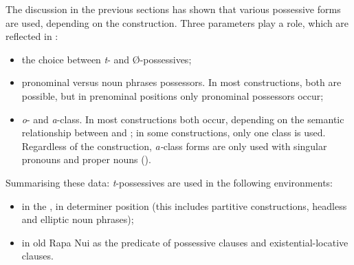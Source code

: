 
The discussion in the previous sections has shown that various possessive forms are used, depending on the construction. Three parameters play a role, which are reflected in :

\begin{itemize}
\item 
the choice between \textit{t}{}- and Ø-possessives;

\item 
pronominal versus noun phrases possessors. In most constructions, both are possible, but in prenominal positions only pronominal possessors occur; 

\item 
\textit{o}{}- and \textit{a}{}-class. In most constructions both occur, depending on the semantic relationship between  and ; in some constructions, only one class is used. Regardless of the construction, \textit{a-}class forms are only used with singular pronouns and proper nouns ().

\end{itemize}

Summarising these data: \textit{t}{}-possessives are used in the following environments:

\begin{itemize}
\item 
in the , in determiner position (this includes partitive constructions, headless and elliptic noun phrases);

\item 
in old Rapa Nui as the predicate of possessive clauses and existential-locative clauses.

\end{itemize}

